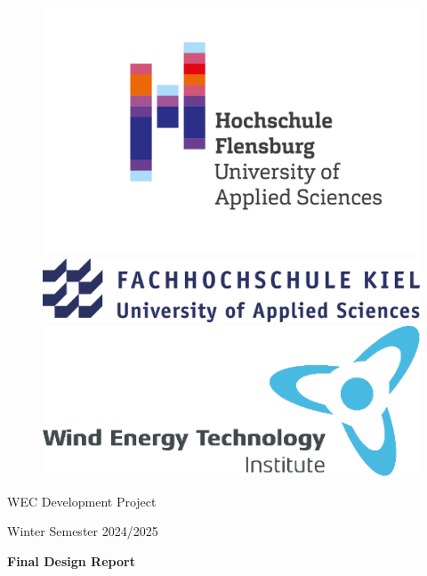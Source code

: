 \newpage
\thispagestyle{empty}
{\selectfont
	\hfuzz=20pt       %
	
	\begin{figure}[!htb]
		\includegraphics[width=\linewidth]{Figures/logos/HSFL}
		\endminipage\hfill
		\includegraphics[width=\linewidth]{Figures/logos/FHKiel}
		\endminipage\hfill
		\includegraphics[width=\linewidth]{Figures/logos/WETI}
		\endminipage
	\end{figure}
		
	
	\vspace{0.5cm}
	\begin{minipage}[b][0cm][t]{\textwidth}
		\fontsize{18pt}{18pt}
		\selectfont
		\begin{center}
			WEC Development Project
		\end{center}
		\fontsize{14pt}{14pt}
		\selectfont
		\begin{center}
			Winter Semester 2024/2025
		\end{center}
		\fontsize{18pt}{18pt}
		\selectfont
		\begin{center}
			\textbf{Final Design Report}
		\end{center}
	\end{minipage}
	
}

